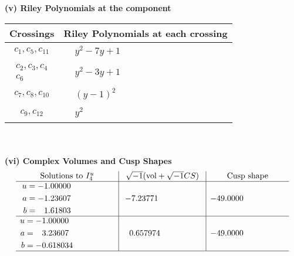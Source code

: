 \documentclass[1p]{elsarticle_modified}
\theoremstyle{definition}
\newcommand{\I}{\sqrt{-1}}
\begin{document}
\newpage\renewcommand{\arraystretch}{1}
\flushleft \textbf{(v) Riley Polynomials at the component}\newline \\
\begin{tabular}{m{50pt}|m{274pt}}
Crossings & \hspace{64pt}Riley Polynomials at each crossing \\
\hline $$\begin{aligned}c_{1},c_{5},c_{11}\end{aligned}$$&$\begin{aligned}
&y^2-7 y+1
\end{aligned}$\\
\hline $$\begin{aligned}c_{2},c_{3},c_{4}\\c_{6}\end{aligned}$$&$\begin{aligned}
&y^2-3 y+1
\end{aligned}$\\
\hline $$\begin{aligned}c_{7},c_{8},c_{10}\end{aligned}$$&$\begin{aligned}
&(y-1)^2
\end{aligned}$\\
\hline $$\begin{aligned}c_{9},c_{12}\end{aligned}$$&$\begin{aligned}
&y^2
\end{aligned}$\\
\hline
\end{tabular}\\~\\
\newpage\flushleft \textbf{(vi) Complex Volumes and Cusp Shapes}
$$\begin{array}{c|c|c}  
\text{Solutions to }I^u_{4}& \I (\text{vol} + \sqrt{-1}CS) & \text{Cusp shape}\\
 \hline 
\begin{aligned}
u &= -1.00000\phantom{ +0.000000I} \\
a &= -1.23607\phantom{ +0.000000I} \\
b &= \phantom{-}1.61803\phantom{ +0.000000I}\end{aligned}
 & -7.23771\phantom{ +0.000000I} & -49.0000\phantom{ +0.000000I} \\ \hline\begin{aligned}
u &= -1.00000\phantom{ +0.000000I} \\
a &= \phantom{-}3.23607\phantom{ +0.000000I} \\
b &= -0.618034\phantom{ +0.000000I}\end{aligned}
 & \phantom{-}0.657974\phantom{ +0.000000I} & -49.0000\phantom{ +0.000000I}\\
 \hline 
 \end{array}$$\newpage\newpage\renewcommand{\arraystretch}{1}
\end{document}
